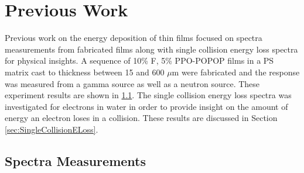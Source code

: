 
\section{Previous Work}
\label{sec:PreviousWork}
Previous work on the energy deposition of thin films focused on spectra measurements from fabricated films along with single collision energy loss spectra for physical insights.
A sequence of 10\% F, 5\% PPO-POPOP films in a PS matrix cast to thickness between 15 and 600 $\mu$m were fabricated and the response was measured from a gamma source as well as a neutron source.
These experiment results are shown in \ref{sec:SpectraMeasurements}.
The single collision energy loss spectra was investigated for electrons in water in order to provide insight on the amount of energy an electron loses in a collision. These results are discussed in Section \ref{sec:SingleCollisionELoss}.

\subsection{Spectra Measurements}
\label{sec:SpectraMeasurements}


